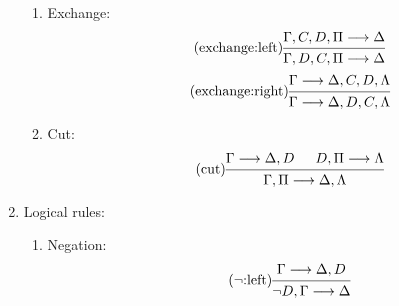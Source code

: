 \documentclass[11pt,a4paper]{article}
\begin{document}
\begin{definition}
\begin{enumerate}
\begin{enumerate}
            \item\label{it:exchange} Exchange:
                \begin{equation}
                    \tag{exchange:left}
                    \label{eq:exchange:left}
                    \begin{prooftree}
                        \hypo{\Gamma,C, D, \Pi\seq\Delta}
                        \infer1{\Gamma, D, C, \Pi\seq\Delta}
                    \end{prooftree}
                \end{equation}
                \begin{equation}
                    \tag{exchange:right}%
                    \label{eq:exchange:right}
                    \begin{prooftree}
                        \hypo{\Gamma\seq\Delta, C, D, \Lambda}
                        \infer1{\Gamma\seq\Delta, D, C, \Lambda}
                    \end{prooftree}
                \end{equation}
            \item\label{it:cut} Cut:
                \begin{equation}
                    \tag{cut}
                    \label{eq:cut}
                    \begin{prooftree}
                        \hypo{\Gamma\seq\Delta, D}
                        \hypo{D, \Pi\seq\Lambda}
                        \infer2{\Gamma, \Pi\seq\Delta, \Lambda}
                    \end{prooftree}
                \end{equation}
        \end{enumerate}
    \item\label{it:logical rules} Logical rules:
        \begin{enumerate}
            \item\label{it:negation} Negation:
                \begin{equation}
                    \tag{\(\lnot\):left}
                    \label{eq:lnot:left}
                    \begin{prooftree}
                        \hypo{\Gamma\seq\Delta, D}
                        \infer1{\lnot D, \Gamma\seq\Delta}
                    \end{prooftree}
                \end{equation}
                \begin{equation}
                    \tag{\(\lnot\):right}

\end{equation}
\end{enumerate}
\end{enumerate}
\end{definition}
\end{document}
